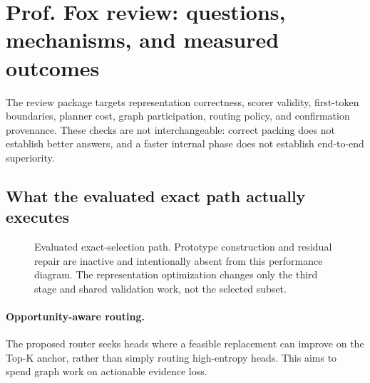 \documentclass[10pt,letterpaper]{article}
\begin{document}
\section{Prof. Fox review: questions, mechanisms, and measured outcomes}
\label{sec:fox}
The review package targets representation correctness, scorer validity,
first-token boundaries, planner cost, graph participation, routing policy,
and confirmation provenance. These checks are not interchangeable: correct
packing does not establish better answers, and a faster internal phase
does not establish end-to-end superiority.

\subsection{What the evaluated exact path actually executes}
\begin{figure}[htbp]
\centering
{}
\caption{Evaluated exact-selection path. Prototype construction and
residual repair are inactive and intentionally absent from this performance
diagram. The representation optimization changes only the third stage and
shared validation work, not the selected subset.}
\label{fig:path}
\end{figure}

\paragraph{Opportunity-aware routing.}
The proposed router seeks heads where a feasible replacement can improve
on the Top-K anchor, rather than simply routing high-entropy heads.
This aims to spend graph work on actionable evidence loss.
\end{document}

